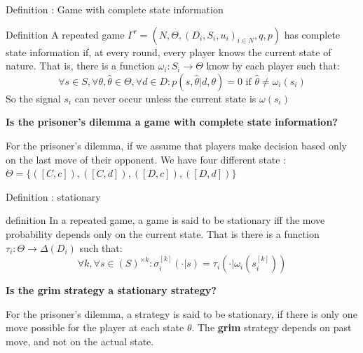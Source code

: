 \begin{frame}{Definition : Game with complete state information}

\begin{block}{Definition}
A repeated game $\Gamma^r = (N,\Theta, (D_i,S_i,u_i)_{i\in N},q,p)$ has {\color{green}complete state information} if, at every round, every player knows the current state of nature. That is, there is a function $\omega_i:S_i \rightarrow \Theta$ know by each player such that:
\begin{equation*}
    \forall s \in S, \forall \theta, \hat{\theta} \in \Theta, \forall d \in D : p(s,\hat{\theta} | d,\theta) = 0 \text{ if } \hat{\theta} \neq \omega_i(s_i)
\end{equation*}
So the signal $s_i$ can never occur unless the current state is $\omega(s_i)$
\end{block}

\pause
\textbf{\color{green}Is the prisoner's dilemma a game with complete state information?}
\pause

For the prisoner's dilemma, if we assume that \alert{players make decision based only on the last move of their opponent}. We have four different state : $\Theta = \{([C,c]), ([C,d]), ([D,c]), ([D,d])\}$

\end{frame}

\begin{frame}{Definition : stationary}

\begin{block}{definition}
In a repeated game, a game is said to be {\color{green}stationary} iff the move probability depends only on the current state. That is there is a function $\tau_i : \Theta \rightarrow \Delta(D_i)$ such that:
\begin{equation*}
	\forall k, \forall s \in (S)^{\times k} : \sigma_i^{[k]}(\cdot | s) = \tau_i(\cdot | \omega_i(s_i^{[k]}))
\end{equation*}
\end{block}

\pause
\textbf{\color{green}Is the grim strategy a stationary strategy?}
\pause

For the prisoner's dilemma, a strategy is said to be stationary, if there is only one move possible for the player at each state $\theta$. The \textbf{grim} strategy depends on past move, and not on the actual state.

\end{frame}

